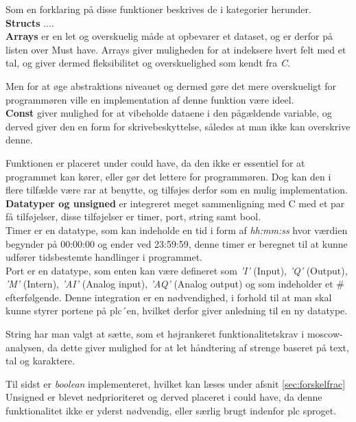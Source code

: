 \noindent Som en forklaring på disse funktioner beskrives de i kategorier herunder.\\

\noindent\textbf{Structs}
....
\\


\noindent\textbf{Arrays}
er en let og overskuelig måde at opbevarer et dataset, og er derfor på listen over Must have. Arrays giver muligheden for at indeksere hvert felt med et tal, og giver dermed fleksibilitet og overskuelighed som kendt fra \textit{C}.

Men for at øge abstraktions niveauet og dermed gøre det mere overskueligt for programmøren ville en implementation af denne funktion være ideel.\\

\noindent\textbf{Const}
giver mulighed for at vibeholde dataene i den pågældende variable, og derved giver den en form for skrivebeskyttelse, således at man ikke kan overskrive denne.

Funktionen er placeret under could have, da den ikke er essentiel for at programmet kan kører, eller gør det lettere for programmøren. 
Dog kan den i flere tilfælde være rar at benytte, og tilføjes derfor som en mulig implementation.\\

\noindent\textbf{Datatyper og unsigned}
er integreret meget sammenligning med C med et par få tilføjelser, disse tilføjelser er timer, port, string samt bool.\\
Timer er en datatype, som kan indeholde en tid i form af \textit{hh:mm:ss} hvor værdien begynder på 00:00:00 og ender ved 23:59:59, denne timer er beregnet til at kunne udfører tidsbestemte handlinger i programmet.\\
Port er en datatype, som enten kan være defineret som \textit{'I'} (Input), \textit{'Q'} (Output), \textit{'M'} (Intern), \textit{'AI'} (Analog input), \textit{'AQ'} (Analog output) og som indeholder et \# efterfølgende. Denne integration er en nødvendighed, i forhold til at man skal kunne styrer portene på \gls{plc}´en, hvilket derfor giver anledning til en ny datatype.

String har man valgt at sætte, som et højrankeret funktionalitetskrav i \gls{moscow}-analysen, da dette giver mulighed for at let håndtering af strenge baseret på text, tal og karaktere. 

Til sidst er \textit{boolean} implementeret, hvilket kan læses under afsnit \ref{sec:forskelfrac}\\
Unsigned er blevet nedprioriteret og derved placeret i could have, da denne funktionalitet ikke er yderst nødvendig, eller særlig brugt indenfor \gls{plc} sproget.\\


